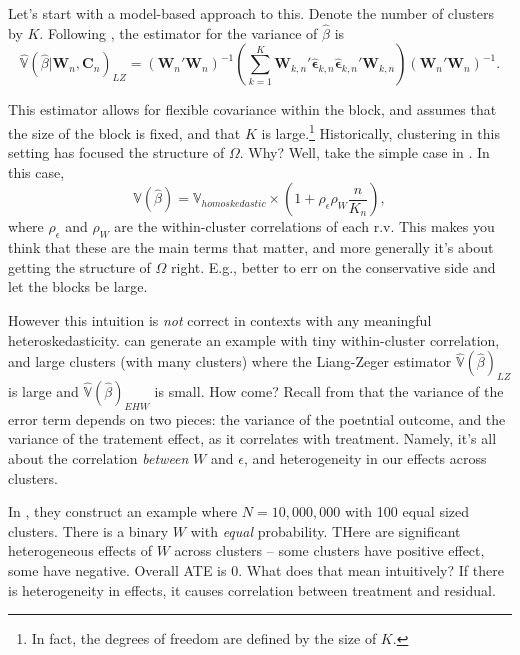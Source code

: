 \documentclass{tufte-handout}
\theoremstyle{break}
\begin{document}
Let's start with a model-based approach to this. Denote the number of clusters by $K$. Following \citet{liang1986longitudinal}, the estimator for the variance of $\hat{\beta}$  is
\begin{equation}
  \hat{\mathbb{V}}(\hat{\beta} |\mathbf{W}_{n}, \mathbf{C}_{n})_{LZ} = (\mathbf{W}_{n}'\mathbf{W}_{n})^{-1}\left(\sum_{k=1}^{K}\mathbf{W}_{k,n}'\hat{\boldsymbol{\epsilon}}_{k,n}\hat{\boldsymbol{\epsilon}}_{k,n}'\boldsymbol{W}_{k,n}\right) (\mathbf{W}_{n}'\mathbf{W}_{n})^{-1}.
\end{equation}

This estimator allows for flexible covariance within the block, and assumes that the size of the block is fixed, and that $K$ is large.\footnote{In fact, the degrees of freedom are defined by the size of $K$.}  Historically, clustering in this setting has focused the structure of $\Omega$. Why? Well, take the simple case  in . In this case,
\begin{equation}
  \mathbb{V}(\hat{\beta}) = \mathbb{V}_{homoskedastic}\times \left( 1+ \rho_{\epsilon}\rho_{W}\frac{n}{K_{n}}\right),
\end{equation}
where $\rho_{\epsilon}$ and $\rho_{W}$ are the within-cluster correlations of each r.v. This makes you think that these are the main terms that matter, and more generally it's about getting the structure of $\Omega$ right. E.g., better to err on the conservative side and let the blocks be large. 

However this intuition is \emph{not} correct in contexts with any meaningful heteroskedasticity.  \citet{abadie2023should} can generate an example with tiny within-cluster
    correlation, and large clusters (with many clusters) where the Liang-Zeger estimator $\hat{\mathbb{V}}(\hat{\beta})_{LZ}$ is large and $\hat{\mathbb{V}}(\hat{\beta})_{EHW}$ is small. How come? Recall from  that the variance of the error term depends on two pieces: the variance of the poetntial outcome, and the variance of the tratement effect, as it correlates with treatment. Namely, it's all about the correlation \emph{between} $W$ and $\epsilon$, and heterogeneity in our effects across clusters.

In \citet{abadie2023should}, they construct an example where $N = 10,000,000$ with 100 equal sized clusters. There is a binary $W$ with \emph{equal} probability.  THere are significant heterogeneous effects of $W$ across clusters -- some clusters have positive effect, some have negative. Overall ATE is 0. What does that mean intuitively? If there is heterogeneity in effects, it causes correlation between treatment and residual.
\end{document}
